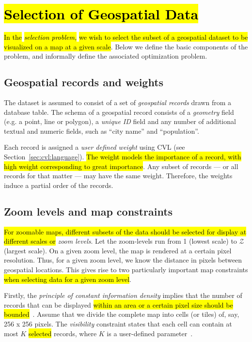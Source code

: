 \section{\hl{Selection of Geospatial Data}}
\label{sec:background}

\hl{In the }\emph{\hl{selection problem,}}\hl{ we wish to select the subset of a geospatial dataset to be visualized on a map at a given scale}. Below we define the basic components of the problem, and informally define the associated optimization problem.

\subsection{Geospatial records and weights}
\label{sec:records}

The dataset is assumed to consist of a set of \emph{geospatial records} drawn from a database table. The schema of a geospatial record consists of a \emph{geometry} field (e.g. a point, line or polygon), a \emph{unique ID} field and any number of additional textual and numeric fields, such as ``city name'' and ``population''.

Each record is assigned a \emph{user defined weight} using CVL (see Section~\ref{sec:cvl:language}). \hl{The weight models the importance of a record, with high weight corresponding to great importance}. Any subset of records --- or all records for that matter --- may have the same weight. Therefore, the weights induce a partial order of the records.

\subsection{Zoom levels and map constraints}
\label{sec:constraints}
\hl{For zoomable maps, different subsets of the data should be selected for display at different scales or }\emph{zoom levels}. Let the zoom-levels run from 1 (lowest scale) to $\mathcal{Z}$ (largest scale). On a given zoom level, the map is rendered at a certain pixel resolution. Thus, for a given zoom level, we know the distance in pixels between geospatial locations. This gives rise to two particularly important map constraints \hl{when selecting data for a given zoom level}.

Firstly, the \emph{principle of constant information density} implies that the number of records that can be displayed \hl{within an area or a certain pixel size should be bounded}~\cite{topfer1966principles}. Assume that we divide the complete map into cells (or tiles) of, say, 256 x 256 pixels. The \emph{visibility} constraint states that each cell can contain at most $K$ \hl{selected} records, where $K$ is a user-defined parameter~\cite{sarma2012fusiontables}.

